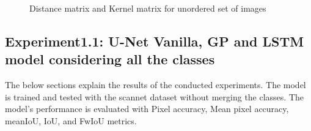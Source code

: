 	\begin{figure}
		\centering
		\qquad
		\caption{Distance matrix and Kernel matrix for unordered set of images}%
		\label{fig:unordered_D_and_K}%
	\end{figure}
	

    \subsection{Experiment1.1: U-Net Vanilla, GP and LSTM model considering all the classes}
    
    The below sections explain the results of the conducted experiments. The model is trained and tested with the scannet dataset without merging the classes. The model's performance is evaluated with Pixel accuracy, Mean pixel accuracy, meanIoU, IoU, and FwIoU metrics.

